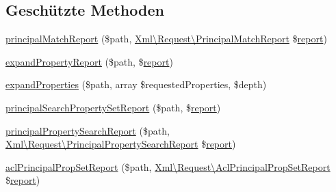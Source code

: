 \subsection*{Geschützte Methoden}
\begin{DoxyCompactItemize}
\item 
\mbox{\hyperlink{class_sabre_1_1_d_a_v_a_c_l_1_1_plugin_ac96f39c025103c8f2b8032dbe19a58a5}{principal\+Match\+Report}} (\$path, \mbox{\hyperlink{class_sabre_1_1_d_a_v_a_c_l_1_1_xml_1_1_request_1_1_principal_match_report}{Xml\textbackslash{}\+Request\textbackslash{}\+Principal\+Match\+Report}} \$\mbox{\hyperlink{class_sabre_1_1_d_a_v_a_c_l_1_1_plugin_a8fd89e987403abdbca4a8fe30701afc1}{report}})
\item 
\mbox{\hyperlink{class_sabre_1_1_d_a_v_a_c_l_1_1_plugin_a2c6836c3ec6c999afc91ad91d083279b}{expand\+Property\+Report}} (\$path, \$\mbox{\hyperlink{class_sabre_1_1_d_a_v_a_c_l_1_1_plugin_a8fd89e987403abdbca4a8fe30701afc1}{report}})
\item 
\mbox{\hyperlink{class_sabre_1_1_d_a_v_a_c_l_1_1_plugin_a9881db02554e41c8099a0aa4e202fecd}{expand\+Properties}} (\$path, array \$requested\+Properties, \$depth)
\item 
\mbox{\hyperlink{class_sabre_1_1_d_a_v_a_c_l_1_1_plugin_a295120b17566d2c326e88d81b004feda}{principal\+Search\+Property\+Set\+Report}} (\$path, \$\mbox{\hyperlink{class_sabre_1_1_d_a_v_a_c_l_1_1_plugin_a8fd89e987403abdbca4a8fe30701afc1}{report}})
\item 
\mbox{\hyperlink{class_sabre_1_1_d_a_v_a_c_l_1_1_plugin_a863e41f6d7c8ac67b365b49b9157ccab}{principal\+Property\+Search\+Report}} (\$path, \mbox{\hyperlink{class_sabre_1_1_d_a_v_a_c_l_1_1_xml_1_1_request_1_1_principal_property_search_report}{Xml\textbackslash{}\+Request\textbackslash{}\+Principal\+Property\+Search\+Report}} \$\mbox{\hyperlink{class_sabre_1_1_d_a_v_a_c_l_1_1_plugin_a8fd89e987403abdbca4a8fe30701afc1}{report}})
\item 
\mbox{\hyperlink{class_sabre_1_1_d_a_v_a_c_l_1_1_plugin_af53450a7c5fa4efcaa40c22d1f8988e7}{acl\+Principal\+Prop\+Set\+Report}} (\$path, \mbox{\hyperlink{class_sabre_1_1_d_a_v_a_c_l_1_1_xml_1_1_request_1_1_acl_principal_prop_set_report}{Xml\textbackslash{}\+Request\textbackslash{}\+Acl\+Principal\+Prop\+Set\+Report}} \$\mbox{\hyperlink{class_sabre_1_1_d_a_v_a_c_l_1_1_plugin_a8fd89e987403abdbca4a8fe30701afc1}{report}})
\end{DoxyCompactItemize}
